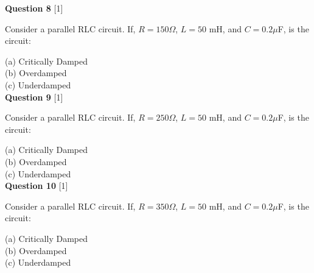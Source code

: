 \documentclass[12pt]{article}
\begin{document}
\noindent
\noindent
{\bf Question 8} [1]

Consider a parallel RLC circuit. If, $R = 150 \Omega$, $L = 50$ mH, and $C = 0.2 \mu$F, is the circuit:

\noindent
(a) Critically Damped\\
(b) Overdamped \\%
(c) Underdamped\\

\noindent
\noindent
{\bf Question 9} [1]

Consider a parallel RLC circuit. If, $R = 250 \Omega$, $L = 50$ mH, and $C = 0.2 \mu$F, is the circuit:

\noindent
(a) Critically Damped \\%
(b) Overdamped\\
(c) Underdamped\\

\noindent
\noindent
{\bf Question 10} [1]

Consider a parallel RLC circuit. If, $R = 350 \Omega$, $L = 50$ mH, and $C = 0.2 \mu$F, is the circuit:

\noindent
(a) Critically Damped\\
(b) Overdamped\\
(c) Underdamped \\%
\end{document}
